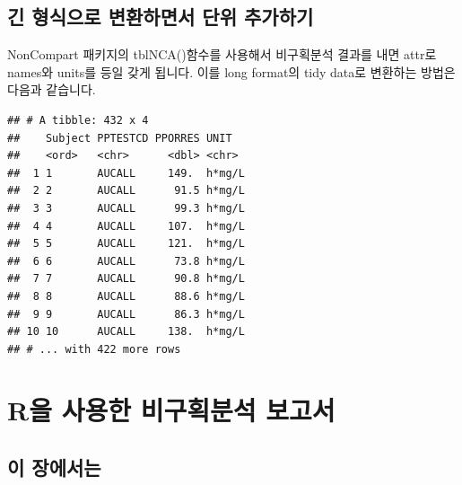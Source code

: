 \documentclass[
  12pt,
]{krantz}
\newenvironment{Shaded}{\begin{snugshade}}{\end{snugshade}}
\newcommand{\DataTypeTok}[1]{\textcolor[rgb]{0.13,0.29,0.53}{#1}}
\newcommand{\KeywordTok}[1]{\textcolor[rgb]{0.13,0.29,0.53}{\textbf{#1}}}
\newcommand{\NormalTok}[1]{#1}
\newcommand{\OperatorTok}[1]{\textcolor[rgb]{0.81,0.36,0.00}{\textbf{#1}}}
\newcommand{\StringTok}[1]{\textcolor[rgb]{0.31,0.60,0.02}{#1}}
\begin{document}
\hypertarget{long-format}{%
\section{긴 형식으로 변환하면서 단위 추가하기}\label{long-format}}

NonCompart 패키지의 tblNCA()함수를 사용해서 비구획분석 결과를 내면 attr로 names와 units를 등일 갖게 됩니다. 이를 long format의 tidy data로 변환하는 방법은 다음과 같습니다.

\begin{Shaded}
\end{Shaded}

\begin{verbatim}
## # A tibble: 432 x 4
##    Subject PPTESTCD PPORRES UNIT  
##    <ord>   <chr>      <dbl> <chr> 
##  1 1       AUCALL     149.  h*mg/L
##  2 2       AUCALL      91.5 h*mg/L
##  3 3       AUCALL      99.3 h*mg/L
##  4 4       AUCALL     107.  h*mg/L
##  5 5       AUCALL     121.  h*mg/L
##  6 6       AUCALL      73.8 h*mg/L
##  7 7       AUCALL      90.8 h*mg/L
##  8 8       AUCALL      88.6 h*mg/L
##  9 9       AUCALL      86.3 h*mg/L
## 10 10      AUCALL     138.  h*mg/L
## # ... with 422 more rows
\end{verbatim}

\hypertarget{ncar}{%
\chapter{R을 사용한 비구획분석 보고서}\label{ncar}}

\hypertarget{summary-ncar}{%
\section{이 장에서는}\label{summary-ncar}}
\end{document}
